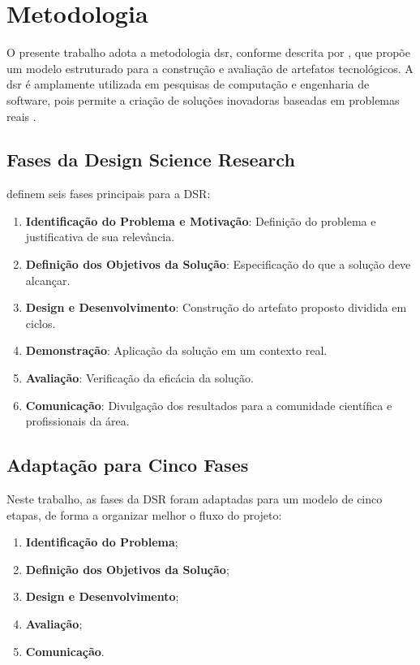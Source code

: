 \chapter{Metodologia}
\label{cap:metodologia}

O presente trabalho adota a metodologia \gls{dsr}, conforme descrita por \cite{peffers2007design}, que propõe um modelo estruturado para a construção e avaliação de artefatos tecnológicos. A \gls{dsr} é amplamente utilizada em pesquisas de computação e engenharia de software, pois permite a criação de soluções inovadoras baseadas em problemas reais \citep{horita2019design}.

\section{Fases da Design Science Research}

\cite{peffers2007design} definem seis fases principais para a DSR:

\begin{enumerate}
    \item \textbf{Identificação do Problema e Motivação}: Definição do problema e justificativa de sua relevância.
    \item \textbf{Definição dos Objetivos da Solução}: Especificação do que a solução deve alcançar.
    \item \textbf{Design e Desenvolvimento}: Construção do artefato proposto dividida em ciclos.
    \item \textbf{Demonstração}: Aplicação da solução em um contexto real.
    \item \textbf{Avaliação}: Verificação da eficácia da solução.
    \item \textbf{Comunicação}: Divulgação dos resultados para a comunidade científica e profissionais da área.
\end{enumerate}

\section{Adaptação para Cinco Fases}

Neste trabalho, as fases da DSR foram adaptadas para um modelo de cinco etapas, de forma a organizar melhor o fluxo do projeto:

\begin{enumerate}
    \item \textbf{Identificação do Problema};
    \item \textbf{Definição dos Objetivos da Solução};
    \item \textbf{Design e Desenvolvimento};
    \item \textbf{Avaliação};
    \item \textbf{Comunicação}.
\end{enumerate}

